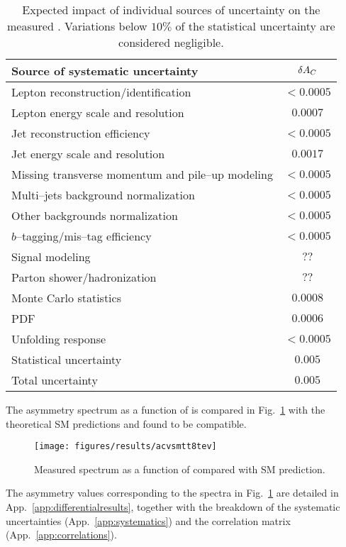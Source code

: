 \begin{table}[!htb]\centering
\begin{tabular}{l c}
\toprule
Source of systematic uncertainty  & $\delta{\ensuremath{A_C}{}}$ \\
\midrule
Lepton reconstruction/identification    & $<0.0005$\\
Lepton energy scale and resolution      &  $0.0007$\\
Jet reconstruction efficiency                 &  $<0.0005$ \\
Jet energy scale and resolution             &  $0.0017$ \\
Missing transverse momentum and pile--up modeling& $<0.0005$\\
Multi--jets background normalization & $<0.0005$\\
Other backgrounds normalization        & $<0.0005$\\
$b$--tagging/mis--tag efficiency       & $<0.0005$\\
Signal modeling                                    & $??$\\
Parton shower/hadronization                & $??$\\
Monte Carlo statistics                            & $0.0008$\\
PDF                                                        &$0.0006$\\
Unfolding response                               &$<0.0005$\\
\midrule
Statistical uncertainty                           & $0.005$ \\
\midrule
Total uncertainty                                   & $0.005$ \\
\bottomrule
\end{tabular}
\caption{Expected impact of individual sources of uncertainty on the
  measured \ac{}. Variations below $10\%$ of the
  statistical uncertainty are considered negligible.}
\label{tab:8tevsystematics}
\end{table}

The asymmetry spectrum as a function of
\mtt{} is compared in Fig.~\ref{fig:8tevacvsmtt}
with the theoretical SM predictions and found to be compatible. 

\begin{figure}[!htb]\centering
  \texttt{[image: figures/results/acvsmtt8tev]}
  \caption{Measured \ac{} spectrum as a function of \mtt{} compared with SM prediction.}
  \label{fig:8tevacvsmtt}
\end{figure}

The asymmetry values corresponding to the spectra in
Fig.~\ref{fig:8tevacvsmtt} are detailed in
App.~\ref{app:differentialresults}, together with the breakdown of the
systematic uncertainties (App.~\ref{app:systematics}) and the
correlation matrix (App.~\ref{app:correlations}).

